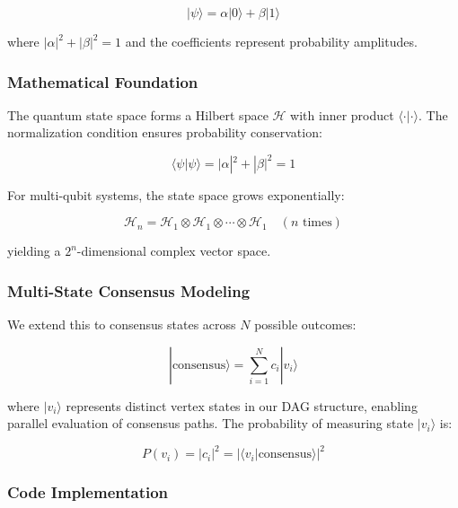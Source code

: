 \documentclass[11pt,a4paper]{article}
\newcommand{\qket}[1]{|#1\rangle}
\newcommand{\qbraket}[2]{\langle#1|#2\rangle}
\begin{document}
\begin{equation}
\qket{\psi} = \alpha\qket{0} + \beta\qket{1}
\label{eq:qubit-superposition}
\end{equation}

where $|\alpha|^2 + |\beta|^2 = 1$ and the coefficients represent probability amplitudes.

\subsubsection{Mathematical Foundation}

The quantum state space forms a Hilbert space $\mathcal{H}$ with inner product $\qbraket{\cdot}{\cdot}$. The normalization condition ensures probability conservation:

\begin{equation}
\qbraket{\psi}{\psi} = |\alpha|^2 + |\beta|^2 = 1
\end{equation}

For multi-qubit systems, the state space grows exponentially:

\begin{equation}
\mathcal{H}_{n} = \mathcal{H}_1 \otimes \mathcal{H}_1 \otimes \cdots \otimes \mathcal{H}_1 \quad (\text{$n$ times})
\end{equation}

yielding a $2^n$-dimensional complex vector space.

\subsubsection{Multi-State Consensus Modeling}

We extend this to consensus states across $N$ possible outcomes:

\begin{equation}
\qket{\text{consensus}} = \sum_{i=1}^{N} c_i \qket{v_i}
\label{eq:consensus-superposition}
\end{equation}

where $\qket{v_i}$ represents distinct vertex states in our DAG structure, enabling parallel evaluation of consensus paths. The probability of measuring state $\qket{v_i}$ is:

\begin{equation}
P(v_i) = |c_i|^2 = |\qbraket{v_i}{\text{consensus}}|^2
\end{equation}

\subsubsection{Code Implementation}
\end{document}
